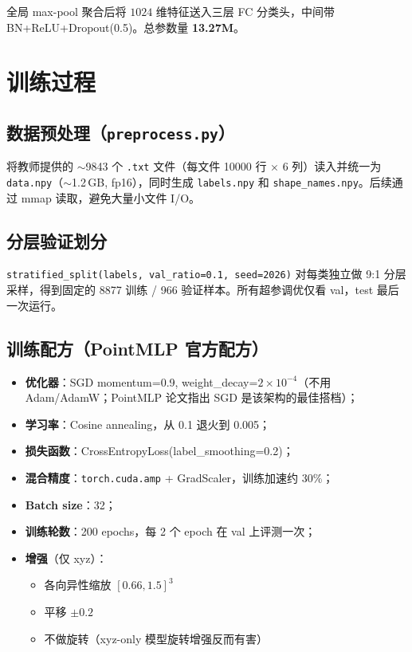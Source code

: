 \documentclass[10pt,a4paper]{ctexart}
\begin{document}
全局 max-pool 聚合后将 $1024$ 维特征送入三层 FC 分类头，中间带 BN+ReLU+Dropout(0.5)。总参数量 \textbf{13.27M}。

\section{训练过程}

\subsection{数据预处理（\texttt{preprocess.py}）}
将教师提供的 $\sim$9843 个 \texttt{.txt} 文件（每文件 10000 行 × 6 列）读入并统一为 \texttt{data.npy}（$\sim$1.2\,GB, fp16），同时生成 \texttt{labels.npy} 和 \texttt{shape\_names.npy}。后续通过 mmap 读取，避免大量小文件 I/O。

\subsection{分层验证划分}
\texttt{stratified\_split(labels, val\_ratio=0.1, seed=2026)} 对每类独立做 9:1 分层采样，得到固定的 8877 训练 / 966 验证样本。所有超参调优仅看 val，test 最后一次运行。

\subsection{训练配方（PointMLP 官方配方）}
\begin{itemize}
\item \textbf{优化器}：SGD momentum=0.9, weight\_decay=$2\times10^{-4}$（不用 Adam/AdamW；PointMLP 论文指出 SGD 是该架构的最佳搭档）；
\item \textbf{学习率}：Cosine annealing，从 0.1 退火到 0.005；
\item \textbf{损失函数}：CrossEntropyLoss(label\_smoothing=0.2)；
\item \textbf{混合精度}：\texttt{torch.cuda.amp} + GradScaler，训练加速约 30\%；
\item \textbf{Batch size}：32；
\item \textbf{训练轮数}：200 epochs，每 2 个 epoch 在 val 上评测一次；
\item \textbf{增强}（仅 xyz）：
  \begin{itemize}
  \item 各向异性缩放 $[0.66, 1.5]^3$
  \item 平移 $\pm 0.2$
  \item 不做旋转（xyz-only 模型旋转增强反而有害）
  \end{itemize}
\end{itemize}
\end{document}
